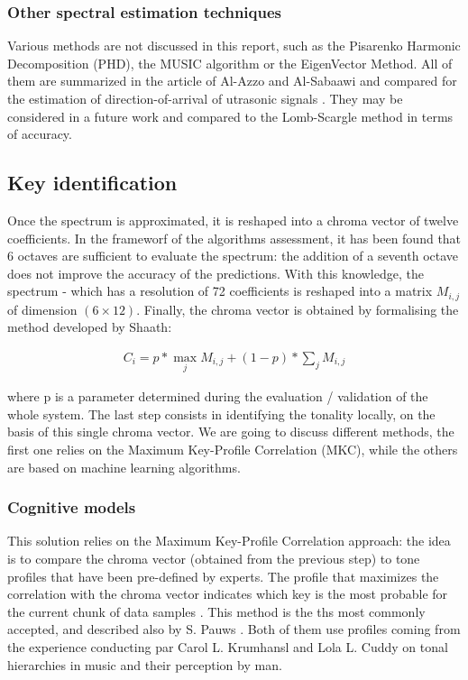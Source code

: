 \documentclass[letterpaper]{article}
\begin{document}
\subsubsection{Other spectral estimation techniques}

Various methods are not discussed in this report, such as the Pisarenko Harmonic Decomposition (PHD), the MUSIC algorithm or the EigenVector Method. All of them are summarized in the article of Al-Azzo and Al-Sabaawi and compared for the estimation of direction-of-arrival of utrasonic signals \citep{MA}. They may be considered in a future work and compared to the Lomb-Scargle method in terms of accuracy.

\subsection{Key identification}

Once the spectrum is approximated, it is reshaped into a chroma vector of twelve coefficients. In the frameworf of the algorithms assessment, it has been found that 6 octaves are sufficient to evaluate the spectrum: the addition of a seventh octave does not improve the accuracy of the predictions. With this knowledge, the spectrum - which has a resolution of 72 coefficients is reshaped into a matrix $M_{i, j}$ of dimension $(6 \times 12)$. Finally, the chroma vector is obtained by formalising the method developed by Sha\textquotesingle ath:

\begin{align}
C_{i} = p * \max_{j} M_{i, j} + (1 - p) * \sum_{j} M_{i, j}
\label{chroma}
\end{align}

where p is a parameter determined during the evaluation / validation of the whole system.
The last step consists in identifying the tonality locally,
on the basis of this single chroma vector. We are going to discuss different methods, the first one relies on the Maximum Key-Profile Correlation (MKC),
while the others are based on machine learning algorithms.

\subsubsection{Cognitive models}

This solution relies on the Maximum Key-Profile Correlation approach: the idea is to compare the chroma vector (obtained from the previous step) to
tone profiles that have been pre-defined by experts. The profile that maximizes the correlation with the chroma vector indicates which key is the most probable
for the current chunk of data samples \citep{AT}. This method is the ths most commonly accepted, and described also by S. Pauws \citep{SP}. Both of them use profiles coming from the experience conducting par Carol L. Krumhansl and Lola L. Cuddy on tonal hierarchies in music and their perception by man.\\
\end{document}
